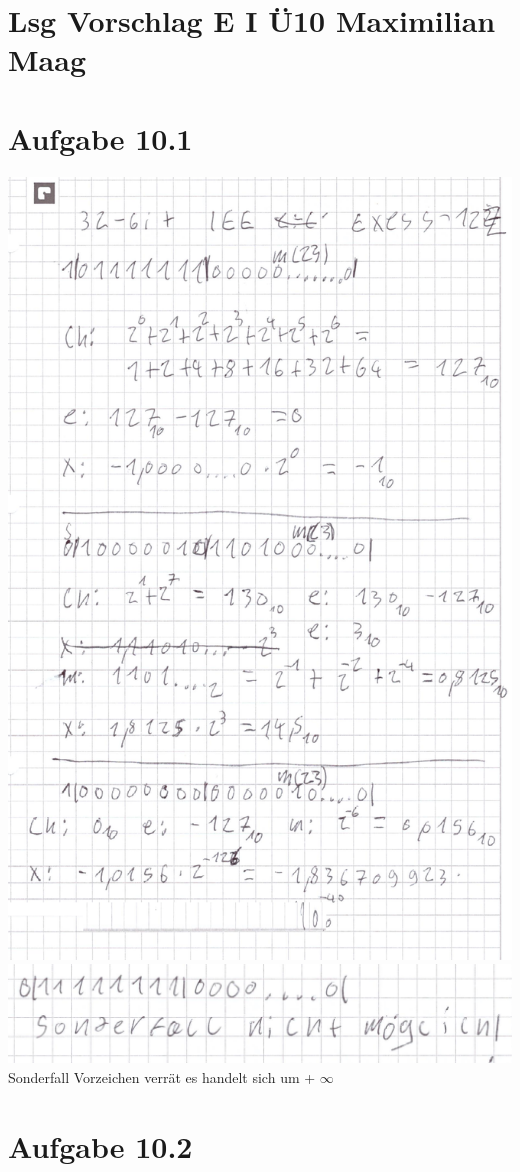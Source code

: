 \documentclass{article}
\begin{document}
	\section*{Lsg Vorschlag E I Ü10 Maximilian Maag}
	\section*{Aufgabe 10.1}
	\includegraphics[width=\linewidth, height=\linewidth]{1011} \\
	\includegraphics[width=\linewidth]{1012} \\
	Sonderfall Vorzeichen verrät es handelt sich um + $\infty$
	\section*{Aufgabe 10.2}
\end{document}

